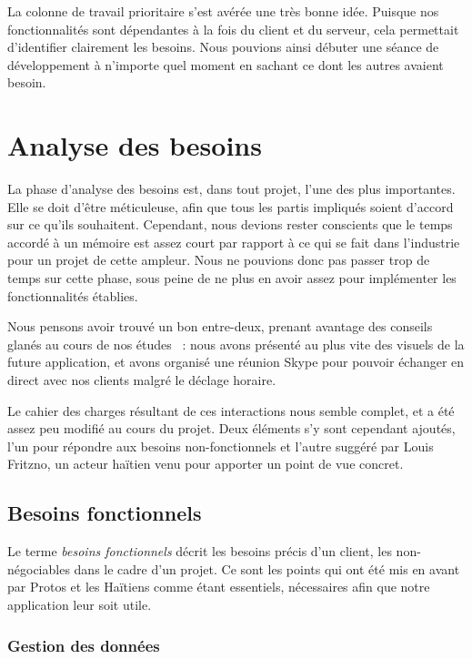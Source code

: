 \documentclass{EPL-master-thesis-covers-FR}
\begin{document}
				La colonne de travail prioritaire s'est avérée une très bonne idée. Puisque nos fonctionnalités sont dépendantes à la fois du client et du serveur, cela permettait d'identifier clairement les besoins. Nous pouvions ainsi débuter une séance de développement à n'importe quel moment en sachant ce dont les autres avaient besoin.



	\chapter{Analyse des besoins}
		\label{sec:analyse_besoins}
		La phase d'analyse des besoins est, dans tout projet, l'une des plus importantes. Elle se doit d'être méticuleuse, afin que tous les partis impliqués soient d'accord sur ce qu'ils souhaitent. Cependant, nous devions rester conscients que le temps accordé à un mémoire est assez court par rapport à ce qui se fait dans l'industrie pour un projet de cette ampleur. Nous ne pouvions donc pas passer trop de temps sur cette phase, sous peine de ne plus en avoir assez pour implémenter les fonctionnalités établies.

		Nous pensons avoir trouvé un bon entre-deux, prenant avantage des conseils glanés au cours de nos études~\cite{ref:kim_coo} : nous avons présenté au plus vite des visuels de la future application, et avons organisé une réunion Skype pour pouvoir échanger en direct avec nos clients malgré le déclage horaire.

		Le cahier des charges résultant de ces interactions nous semble complet, et a été assez peu modifié au cours du projet. Deux éléments s'y sont cependant ajoutés, l'un pour répondre aux besoins non-fonctionnels et l'autre suggéré par Louis Fritzno, un acteur haïtien venu pour apporter un point de vue concret.

		\section{Besoins fonctionnels}

			Le terme \emph{besoins fonctionnels} décrit les besoins précis d'un client, les non-négociables dans le cadre d'un projet. Ce sont les points qui ont été mis en avant par Protos et les Haïtiens comme étant essentiels, nécessaires afin que notre application leur soit utile.

			\subsection*{Gestion des données}
				\label{sec:gest_donnee}
\end{document}
